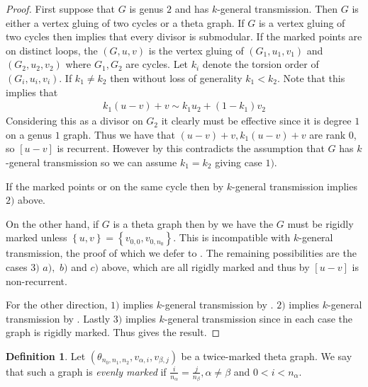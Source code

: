 \documentclass[11pt]{article}
\theoremstyle{definition}
\newtheorem{defi}[theo]{Definition}
\numberwithin{equation}{section}
\newcommand{\set}[1]{\left\{{#1}\right\}}
\begin{document}
\begin{proof}
    First suppose that $G$ is genus $2$ and has $k$-general transmission. Then $G$ is either a vertex gluing of two cycles or a theta graph. If $G$ is a vertex gluing of two cycles then \cite[Lemma 2.5, Theorem 3.11]{Pfl22} implies that every divisor is submodular. If the marked points are on distinct loops, the $(G,u,v)$ is the vertex gluing of $(G_1,u_1,v_1)$ and $(G_2,u_2,v_2)$ where $G_1,G_2$ are cycles. Let $k_i$ denote the torsion order of $(G_i,u_i,v_i)$. If $k_1 \neq k_2$ then without loss of generality $k_1<k_2$. Note that this implies that
    \begin{align*}
        k_1(u-v)+v \sim k_1u_2 + (1-k_1)v_2
    \end{align*}
    Considering this as a divisor on $G_2$ it clearly must be effective since it is degree $1$ on a genus $1$ graph. Thus we have that $(u-v)+v, k_1(u-v)+v$ are rank $0$, so $[u-v]$ is recurrent. However by  this contradicts the assumption that $G$ has $k$-general transmission so we can assume $k_1 = k_2$ giving case $1)$.

    If the marked points or on the same cycle then by  $k$-general transmission implies $2)$ above.
    
    On the other hand, if $G$ is a theta graph then by  we have the $G$ must be rigidly marked unless $\set{u,v} = \set{v_{0,0},v_{0,n_0}}$. This is incompatible with $k$-general transmission, the proof of which we defer to . The remaining possibilities are the cases $3)$ $ a),$ $b)$ and $c)$ above, which are all rigidly marked and thus by  $[u-v]$ is non-recurrent.

    For the other direction, $1)$ implies $k$-general transmission by \cite[Theorem A]{Pfl22}. $2)$ implies $k$-general transmission by . Lastly $3)$ implies $k$-general transmission since in each case the graph is rigidly marked. Thus  gives the result.
\end{proof}

\begin{defi}\label{defn:evenlyMarked}
    Let $(\theta_{n_0,n_1,n_2},v_{\alpha,i},v_{\beta,j})$ be a twice-marked theta graph. We say that such a graph is \textit{evenly marked} if $\frac{i}{n_\alpha} = \frac{j}{n_\beta}, \alpha \neq \beta$ and $0<i<n_\alpha$.
\end{defi}
\end{document}
